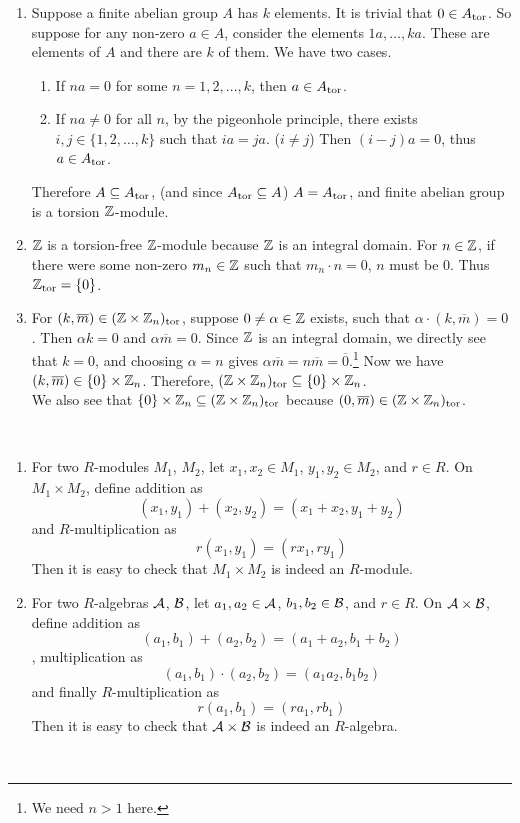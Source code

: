 \begin{enumerate}
	\item Suppose a finite abelian group $A$ has $k$ elements. It is trivial that $0 \in A_{\text{tor}}$. So suppose for any non-zero $a\in A$, consider the elements $1a, \dots, ka$. These are elements of $A$ and there are $k$ of them. We have two cases.
	\begin{enumerate}
		\item If $na = 0$ for some $n = 1, 2, \dots, k$, then $a \in A_{\text{tor}}$.
		\item If $na \neq 0$ for all $n$, by the pigeonhole principle, there exists $i, j\in \{1, 2, \dots, k\}$ such that $ia = ja$. ($i\neq j$) Then $(i - j)a = 0$, thus $a\in A_{\text{tor}}$.
	\end{enumerate}
	Therefore $A\subseteq A_{\text{tor}}$, (and since $A_{\text{tor}}\subseteq A$) $A = A_{\text{tor}}$, and finite abelian group is a torsion $\mathbb{Z}$-module.
	\item $\mathbb{Z}$ is a torsion-free $\mathbb{Z}$-module because $\mathbb{Z}$ is an integral domain. For $n\in \mathbb{Z}$, if there were some non-zero $m_n \in \mathbb{Z}$ such that $m_n \cdot n = 0$, $n$ must be 0. Thus $\mathbb{Z}_{\text{tor}} = \{0\}$.
	\item For $(k, \overline{m})\in (\mathbb{Z}\times \mathbb{Z}_n)_{\text{tor}}$, suppose $0\neq \alpha \in \mathbb{Z}$ exists, such that $\alpha \cdot (k, \overline{m}) = 0$. Then $\alpha k =0$ and $\alpha \overline{m} = 0$. Since $\mathbb{Z}$ is an integral domain, we directly see that $k = 0$, and choosing $\alpha = n$ gives $\alpha\overline{m} = n\overline{m} = \overline{0}$.\footnote{We need $n>1$ here.} Now we have $(k, \overline{m})\in \{0\}\times \mathbb{Z}_n$. Therefore, $(\mathbb{Z}\times \mathbb{Z}_n)_{\text{tor}} \subseteq \{0\}\times \mathbb{Z}_n$.\\
	We also see that $\{0\}\times \mathbb{Z}_n \subseteq (\mathbb{Z}\times\mathbb{Z}_n)_{\text{tor}}$ because $(0, \overline{m}) \in (\mathbb{Z}\times\mathbb{Z}_n)_{\text{tor}}$.
\end{enumerate}~
\\
\begin{enumerate}
	\item For two $R$-modules $M_1$, $M_2$, let $x_1, x_2\in M_1$, $y_1, y_2\in M_2$, and $r\in R$. On $M_1\times M_2$, define addition as
	$$(x_1, y_1) + (x_2, y_2) = (x_1+x_2, y_1+y_2)$$
	and $R$-multiplication as
	$$r(x_1, y_1) = (rx_1, ry_1)$$
	Then it is easy to check that $M_1\times M_2$ is indeed an $R$-module.
	\item For two $R$-algebras $\mathcal{A}$, $\mathcal{B}$, let $a_1, a_2\in \mathcal{A}$, $b_1, b_2\in \mathcal{B}$, and $r\in R$. On $\mathcal{A}\times \mathcal{B}$, define addition as
	$$(a_1, b_1) + (a_2, b_2) = (a_1+a_2, b_1+b_2)$$
	, multiplication as
	$$(a_1, b_1)\cdot(a_2, b_2) = (a_1a_2, b_1b_2)$$
	and finally $R$-multiplication as
	$$r(a_1, b_1) = (ra_1, rb_1)$$
	Then it is easy to check that $\mathcal{A}\times\mathcal{B}$ is indeed an $R$-algebra.
\end{enumerate}~
